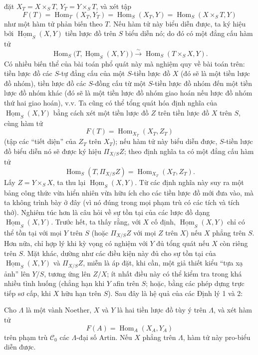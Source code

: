 đặt $X_T=X\times_ST$, $Y_T=Y\times_ST$, và xét tập
\[
  F(T)=\operatorname{Hom}_T(X_T,Y_T)
      =\operatorname{Hom}_S(X_T,Y)
      =\operatorname{Hom}_S(X\times_ST,Y)
\]
như một hàm tử phản biến theo $T$. Nếu hàm tử này biểu diễn được, ta ký hiệu
bởi $\underline{\operatorname{Hom}}_S(X,Y)$ tiền lược đồ trên $S$ biểu diễn
nó; do đó có một đẳng cấu hàm tử
\[
  \operatorname{Hom}_S
  \bigl(T,\underline{\operatorname{Hom}}_S(X,Y)\bigr)
  \xrightarrow{\sim}
  \operatorname{Hom}_S(T\times_SX,Y).
\]
Có nhiều biến thể của bài toán phổ quát này mà nghiệm quy về bài toán trên:
tiền lược đồ các $S$-tự đẳng cấu của một $S$-tiền lược đồ $X$ (đó sẽ là một
tiền lược đồ nhóm), tiền lược đồ các $S$-đồng cấu từ một $S$-tiền lược đồ nhóm
đến một tiền lược đồ nhóm khác (đó sẽ là một tiền lược đồ nhóm giao hoán nếu
lược đồ nhóm thứ hai giao hoán), v.v. Ta cũng có thể tổng quát hóa định nghĩa
của $\underline{\operatorname{Hom}}_S(X,Y)$ bằng cách xét một tiền lược đồ $Z$
trên tiền lược đồ $X$ trên $S$, cùng hàm tử
\[
  F(T)=\operatorname{Hom}_{X_T}(X_T,Z_T)
\]
(tập các ``tiết diện'' của $Z_T$ trên $X_T$); nếu hàm tử này biểu diễn được,
$S$-tiền lược đồ biểu diễn nó sẽ được ký hiệu $\Pi_{X/S}Z$; theo định nghĩa ta
có một đẳng cấu hàm tử
\[
  \operatorname{Hom}_S(T,\Pi_{X/S}Z)
  =\operatorname{Hom}_{X_T}(X_T,Z_T).
\]
Lấy $Z=Y\times_SX$, ta thu lại
$\underline{\operatorname{Hom}}_S(X,Y)$. Từ các định nghĩa này suy ra một bảng
công thức vừa hiển nhiên vừa hữu ích cho các tiền lược đồ mới đưa vào, mà ta
không trình bày ở đây (vì nó đúng trong mọi phạm trù có các tích và tích thớ).
Nghiêm túc hơn là câu hỏi về sự tồn tại của các lược đồ dạng
$\underline{\operatorname{Hom}}_S(X,Y)$. Trước hết, ta thấy rằng, với $X$ cố
định, $\underline{\operatorname{Hom}}_S(X,Y)$ chỉ có thể tồn tại với mọi $Y$
trên $S$ (hoặc $\Pi_{X/S}Z$ với mọi $Z$ trên $X$) nếu $X$ phẳng trên $S$.
Hơn nữa, chỉ hợp lý khi kỳ vọng có nghiệm với $Y$ đủ tổng quát nếu $X$ còn
riêng trên $S$. Mặt khác, dường như các điều kiện này đủ cho sự tồn tại của
$\underline{\operatorname{Hom}}_S(X,Y)$ và $\Pi_{X/S}Z$, miễn là áp đặt, khi
cần, một giả thiết kiểu ``tựa xạ ảnh'' lên $Y/S$, tương ứng lên $Z/X$; ít nhất
điều này có thể kiểm tra trong khá nhiều tình huống (chẳng hạn khi $Y$ afin
trên $S$; hoặc, bằng các phép dựng trực tiếp sơ cấp, khi $X$ hữu hạn trên $S$).
Sau đây là hệ quả của các Định lý 1 và 2:

 Cho $\Lambda$ là một vành Noether, $X$ và $Y$ là hai
tiền lược đồ tùy ý trên $\Lambda$, và xét hàm tử
\[
  F(A)=\operatorname{Hom}_A(X_A,Y_A)
\]
trên phạm trù $\mathcal C_0$ các $\Lambda$-đại số Artin. Nếu $X$ phẳng trên
$\Lambda$, hàm tử này pro-biểu diễn được.

